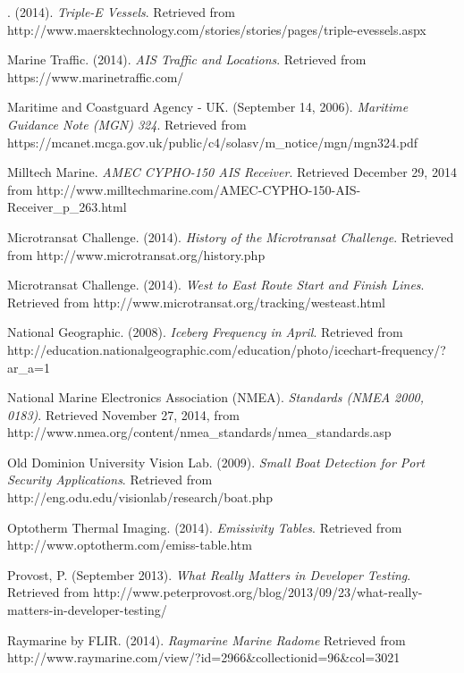 \begin{thebibliography}{99}
. (2014). \textit{Triple-E Vessels}. Retrieved from http://www.maersktechnology.com/stories/stories/pages/triple-evessels.aspx

 Marine Traffic. (2014). \textit{AIS Traffic and Locations}. Retrieved from https://www.marinetraffic.com/

 Maritime and Coastguard Agency - UK. (September 14, 2006). \textit{Maritime Guidance Note (MGN) 324}. Retrieved from https://mcanet.mcga.gov.uk/public/c4/solasv/m\_notice/mgn/mgn324.pdf

 Milltech Marine. \textit{AMEC CYPHO-150 AIS Receiver}. Retrieved December 29, 2014 from http://www.milltechmarine.com/AMEC-CYPHO-150-AIS-Receiver\_p\_263.html

 Microtransat Challenge. (2014). \textit{History of the Microtransat Challenge}. Retrieved from http://www.microtransat.org/history.php

 Microtransat Challenge. (2014). \textit{West to East Route Start and Finish Lines}. Retrieved from http://www.microtransat.org/tracking/westeast.html

 National Geographic. (2008). \textit{Iceberg Frequency in April}. Retrieved from http://education.nationalgeographic.com/education/photo/icechart-frequency/?ar\_a=1

 National Marine Electronics Association (NMEA). \textit{Standards (NMEA 2000, 0183)}. Retrieved November 27, 2014, from http://www.nmea.org/content/nmea\_standards/nmea\_standards.asp

 Old Dominion University Vision Lab. (2009). \textit{Small Boat Detection for Port Security Applications}. Retrieved from http://eng.odu.edu/visionlab/research/boat.php

 Optotherm Thermal Imaging. (2014). \textit{Emissivity Tables}. Retrieved from http://www.optotherm.com/emiss-table.htm

 Provost, P. (September 2013). \textit{What Really Matters in Developer Testing}. Retrieved from http://www.peterprovost.org/blog/2013/09/23/what-really-matters-in-developer-testing/

 Raymarine by FLIR. (2014). \textit{Raymarine Marine Radome} Retrieved from http://www.raymarine.com/view/?id=2966\&collectionid=96\&col=3021


\end{thebibliography}
